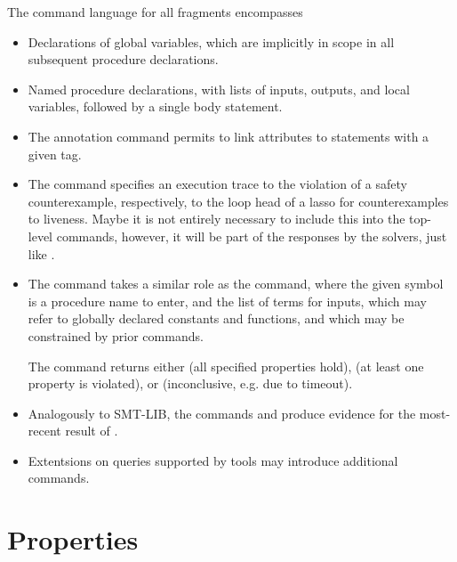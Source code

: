 \documentclass[runningheads]{llncs}
\begin{document}
\noindent
The command language for all fragments encompasses
\begin{itemize}
\item Declarations of global variables,
      which are implicitly in scope in all subsequent procedure declarations.
\item Named procedure declarations,
      with lists of inputs, outputs, and local variables,
      followed by a single body statement.
\item The annotation command permits to link attributes
      to statements with a given tag.
\item The command  specifies an execution trace
      to the violation of a safety counterexample, respectively,
      to the loop head of a lasso for counterexamples to liveness.
      Maybe it is not entirely necessary to include this into the top-level commands,
      however, it will be part of the responses by the solvers,
      just like .
\item The  command takes a similar role as the  command,
      where the given symbol is a procedure name to enter,
      and the list of terms for inputs,
      which may refer to globally declared constants and functions,
      and which may be constrained by prior  commands.

      The command returns either  (all specified properties hold),
       (at least one property is violated),
      or  (inconclusive, e.g. due to timeout).
\item Analogously to SMT-LIB, the commands 
      and  produce evidence
      for the most-recent result of .
\item Extentsions on queries supported by tools may introduce additional commands.
\end{itemize}

\section{Properties}
\end{document}

